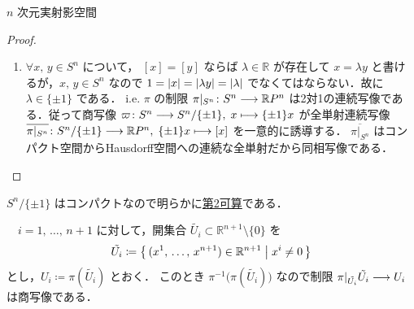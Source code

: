 \documentclass[geometry_main]{subfiles}
\begin{document}
\begin{myexample}[label=ex:topomani-projective]{$n$ 次元実射影空間}
\begin{proof}
\begin{enumerate}
			ここで写像
			\begin{align}
				f \colon \mathbb{R}P^n \lto [0,\, 1],\; [u] \lmto \frac{\abs{\braket{x}{u}}}{\abs{x}\abs{u}}
			\end{align}
			を考える．$[u] = [v] \in \mathbb{R}P^n$ ならばある $\lambda \in \mathbb{R}$ が存在して $u = \lambda v$ と書けるので $f([u]) = f([v])$ が言える．i.e. $f$ は $[u]$ の代表元の取り方によらず，well-definedである．
			$\pi$ が商写像でかつ $f \circ \pi$ が連続であることから $f$ も連続である．
			従って，$[0,\, 1]$ の開集合 $[0,\, r_1),\, (r_2,\, 1] \subset [0,\, 1]$ の $f$ による逆像 $U_1 \coloneqq f^{-1}\bigl([0,\, r_1)\bigr),\, U_2 \coloneqq f^{-1}\bigl((r_2,\, 1]\bigr)$ はどちらも $\mathbb{R}P^n$ の開集合で，かつ $U_1 \cap U_2 = \emptyset$ である．
			$f([y]) \in [0,\, r_1)$ かつ $f([x]) = 1 \in (r_2,\, 1]$ なので $[y] \in U_1,\, [x] \in U_2$ であり，証明が完了した．
			\item $\forall x,\, y \in S^n$ について， $[x] = [y]$ ならば $\lambda \in \mathbb{R}$ が存在して $x = \lambda y$ と書けるが，$x,\, y \in S^n$ なので $1=\abs{x} =\abs{\lambda y} = \abs{\lambda}$ でなくてはならない．故に $\lambda \in \{\pm 1\}$ である．
			i.e. $\pi$ の制限 $\pi|_{S^n} \colon S^n \longrightarrow \mathbb{R}P^n$ は2対1の連続写像である．従って商写像 $\varpi \colon S^n \longrightarrow S^{n}/\{\pm 1\},\; x \longmapsto \{\pm 1\}x$ が全単射連続写像 $\overline{\pi|_{S^n}} \colon S^n/\{\pm 1\} \longrightarrow \mathbb{R}P^n,\; \{\pm 1\} x \longmapsto [x]$ を一意的に誘導する．
			$\overline{\pi|_{S^n}}$ はコンパクト空間からHausdorff空間への連続な全単射だから同相写像である．
		\end{enumerate}
	\end{proof}
	$S^n /\{\pm 1\}$ はコンパクトなので明らかに\hyperref[def:second-countable]{第2可算}である．

	　$i = 1,\, \dots,\, n+1$ に対して，開集合 $\tilde{U_i} \subset \mathbb{R}^{n+1} \setminus \{0\}$ を
	\begin{align}
		\tilde{U_i} \coloneqq \bigl\{\, (x^1,\, \dots,\, x^{n+1}) \in \mathbb{R}^{n+1} \bigm| x^i \neq 0 \,\bigr\} 
	\end{align}
	とし，$U_i \coloneqq \pi(\tilde{U_i})$ とおく．
	このとき $\pi^{-1} \bigl( \pi(\tilde{U_i}) \bigr)$ なので制限 $\pi|_{\tilde{U_i}} \tilde{U_i} \longrightarrow U_i$ は商写像である．
	

\end{myexample}
\end{document}
